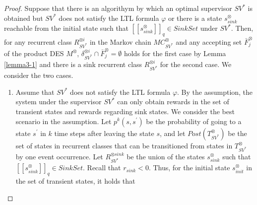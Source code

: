 \documentclass[10pt]{article}
\theoremstyle{definition}
\newcommand{\myspqsink}{\ensuremath{[\![s^{\otimes}_{sink}]\!]}_q}
\begin{document}
\begin{proof}
  Suppose that there is an algorithym by which an optimal supervisor $SV^{\ast}$ is obtained but $SV^{\ast}$ does not satisfy the LTL formula $\varphi$ or there is  a state $s^{\otimes}_{sink}$ reachable from the initial state such that $\myspqsink \in SinkSet$ under $SV^{\ast}$. Then, for any recurrent class $R^{\otimes i}_{{SV}^{\ast}}$ in the Markov chain $MC^{\otimes}_{{SV}^{\ast}}$ and any accepting set $\bar{F}^{\otimes}_j$ of the product DES $M^{\otimes}$,  $\delta^{\otimes i}_{SV^{\ast}} \cap \bar{F}^{\otimes}_j = \emptyset$
  holds for the first case by Lemma \ref{lemma3-1} and there is a sink recurrent class $R^{\otimes i}_{SV^{\ast}}$ for the second case. We consider the two cases.

 \begin{enumerate}
  \item Assume that $SV^{\ast}$ does not satisfy the LTL formula $\varphi$.
  By the assumption, the system under the supervisor $SV^{\ast}$ can only obtain rewards in the set of transient states and rewards regarding sink states. We consider the best scenario in the assumption. Let $p^k(s,s^{\prime})$ be the probability of going to a state $s^{\prime}$ in $k$ time steps after leaving the state $s$, and let $Post(T^{\otimes}_{SV^{\ast}})$ be the set of states in recurrent classes that can be transitioned from states in $T^{\otimes}_{SV^{\ast}}$ by one event occurrence. Let $R^{\otimes sink}_{SV^{\ast}}$ be the union of the states $s^{\otimes}_{sink}$ such that $\myspqsink \in SinkSet$. Recall that $r_{sink} < 0$. Thus, for the initial state $s^{\otimes}_{init}$ in the set of transient states, it holds that


\end{enumerate}
\end{proof}
\end{document}
